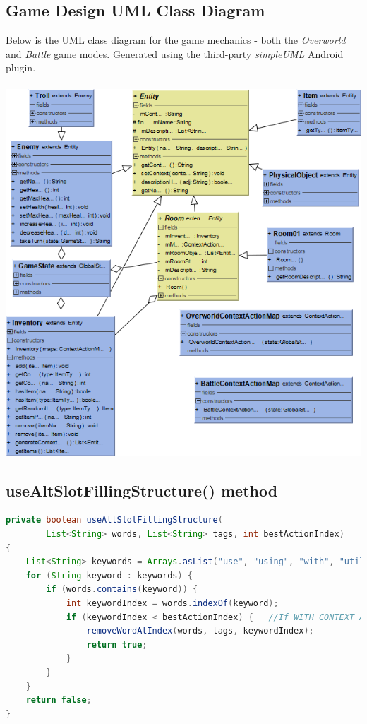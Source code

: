 \documentclass[12pt]{article}
\begin{document}
\subsection{Game Design UML Class Diagram}
\label{appendix:game-uml}
Below is the UML class diagram for the game mechanics - both the \textit{Overworld} and \textit{Battle} game modes. Generated using the third-party \textit{simpleUML} Android plugin.
\\
\\
\includegraphics[width=\textwidth]{game-uml.png}

\newpage
\subsection{useAltSlotFillingStructure() method}
\label{appendix:useAltSlotFillingStructure}
\begin{lstlisting}[language=Java, caption=useAltSlotFillingStructure()]
private boolean useAltSlotFillingStructure(
        List<String> words, List<String> tags, int bestActionIndex)
{
    List<String> keywords = Arrays.asList("use", "using", "with", "utilise");
    for (String keyword : keywords) {
        if (words.contains(keyword)) {
            int keywordIndex = words.indexOf(keyword);
            if (keywordIndex < bestActionIndex) {	//If WITH CONTEXT ACTION TARGET
                removeWordAtIndex(words, tags, keywordIndex);
                return true;
            }
        }
    }
    return false;
}
\end{lstlisting}
\end{document}
